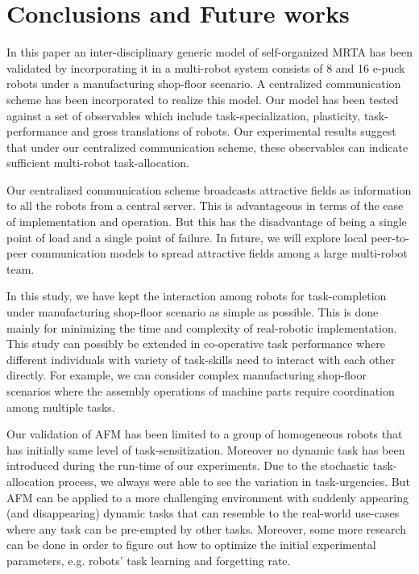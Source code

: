 \documentclass[smallcondensed]{svjour3}
\begin{document}
\section{Conclusions and Future works}
\label{sec:conc}
In this paper  an inter-disciplinary generic model of self-organized MRTA has been validated by incorporating it in a multi-robot system consists of 8 and 16 e-puck robots under a manufacturing shop-floor scenario. A centralized communication scheme has been incorporated to realize this model. Our model has been tested against a set of observables which include task-specialization, plasticity, task-performance and gross translations of robots.  Our experimental results suggest that under our centralized  communication scheme, these observables can indicate sufficient multi-robot task-allocation.

Our centralized communication scheme broadcasts attractive fields as information to all the robots from a central server. This is advantageous in terms of the ease of implementation and operation. But this has the disadvantage of being  a single point of load and a single point of failure. In future, we will explore local peer-to-peer communication models to spread attractive fields among a large multi-robot team.

In this study, we have kept the interaction among robots for task-completion under manufacturing shop-floor scenario as simple as possible. This is done mainly for minimizing the time and complexity of real-robotic implementation. This study can possibly be extended in co-operative task performance where different individuals with variety of task-skills need to interact with each other directly. For example, we can consider complex manufacturing shop-floor scenarios where the assembly operations of machine parts require coordination among multiple tasks. 

Our validation of AFM has been limited to a group of homogeneous robots that has initially same level of task-sensitization. Moreover no dynamic task has been introduced during the run-time of our experiments. Due to the stochastic task-allocation process, we always were able to see the  variation in task-urgencies. But AFM can be applied to a more challenging environment with suddenly appearing (and disappearing) dynamic tasks that can resemble to the real-world use-cases where any task can be pre-empted by other tasks. Moreover, some more research can be done in order to figure out how to optimize the initial experimental parameters, e.g. robots' task learning and forgetting rate. 
\end{document}
